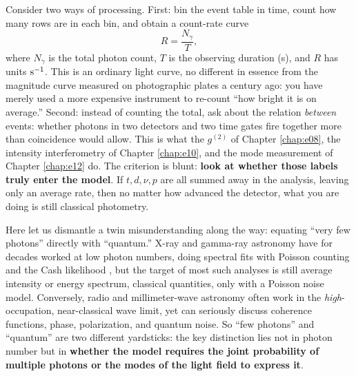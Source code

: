 Consider two ways of processing. First: bin the event table in time, count how many rows are in each bin, and obtain a count-rate curve
\[
  R=\frac{N_\gamma}{T},
\]
where \(N_\gamma\) is the total photon count, \(T\) is the observing duration (s), and \(R\) has units \({\rm s}^{-1}\). This is an ordinary light curve, no different in essence from the magnitude curve measured on photographic plates a century ago: you have merely used a more expensive instrument to re-count ``how bright it is on average.'' Second: instead of counting the total, ask about the relation \emph{between} events: whether photons in two detectors and two time gates fire together more than coincidence would allow. This is what the \(g^{(2)}\) of Chapter \ref{chap:e08}, the intensity interferometry of Chapter \ref{chap:e10}, and the mode measurement of Chapter \ref{chap:e12} do. The criterion is blunt: \textbf{look at whether those labels truly enter the model}. If \(t,d,\nu,p\) are all summed away in the analysis, leaving only an average rate, then no matter how advanced the detector, what you are doing is still classical photometry.

Here let us dismantle a twin misunderstanding along the way: equating ``very few photons'' directly with ``quantum.'' X-ray and gamma-ray astronomy have for decades worked at low photon numbers, doing spectral fits with Poisson counting and the Cash likelihood \citep{1979ApJ...228..939C,1986ApJ...303..336G}, but the target of most such analyses is still average intensity or energy spectrum, classical quantities, only with a Poisson noise model. Conversely, radio and millimeter-wave astronomy often work in the \emph{high}-occupation, near-classical wave limit, yet can seriously discuss coherence functions, phase, polarization, and quantum noise. So ``few photons'' and ``quantum'' are two different yardsticks: the key distinction lies not in photon number but in \textbf{whether the model requires the joint probability of multiple photons or the modes of the light field to express it}.

